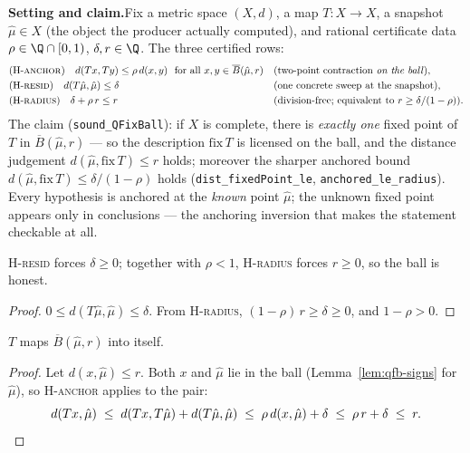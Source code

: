 

\textbf{Setting and claim.}\enspace Fix a metric space $(X, d)$, a map
$T : X \to X$, a snapshot $\hat\mu \in X$ (the object the producer
actually computed), and rational certificate data
$\rho \in \Q \cap [0, 1)$, $\delta, r \in \Q$. The three certified rows:
\begin{align*}
&\text{(H-\textsc{anchor})}\quad d(Tx, Ty) \leq \rho\, d(x, y)
  \ \text{ for all } x, y \in \overline{B}(\hat\mu, r)
  && \text{(two-point contraction \emph{on the ball})},\\
&\text{(H-\textsc{resid})}\quad d(T\hat\mu, \hat\mu) \leq \delta
  && \text{(one concrete sweep at the snapshot)},\\
&\text{(H-\textsc{radius})}\quad \delta + \rho\, r \leq r
  && \text{(division-free; equivalent to } r \geq \delta/(1-\rho)\text{)}.
\end{align*}
The claim (\texttt{sound\_QFixBall}): if $X$ is complete, there is
\emph{exactly one} fixed point of $T$ in $\overline{B}(\hat\mu, r)$ ---
so the description $\mathrm{fix}\,T$ is licensed on the ball, and the
distance judgement $d(\hat\mu, \mathrm{fix}\,T) \leq r$ holds; moreover
the sharper anchored bound $d(\hat\mu, \mathrm{fix}\,T) \leq
\delta/(1-\rho)$ holds (\texttt{dist\_fixedPoint\_le},
\texttt{anchored\_le\_radius}). Every hypothesis is anchored at the
\emph{known} point $\hat\mu$; the unknown fixed point appears only in
conclusions --- the anchoring inversion that makes the statement
checkable at all.

\begin{blemma}\label{lem:qfb-signs}
H-\textsc{resid} forces $\delta \geq 0$; together with $\rho < 1$,
H-\textsc{radius} forces $r \geq 0$, so the ball is honest.
\end{blemma}
\begin{proof}
$0 \leq d(T\hat\mu, \hat\mu) \leq \delta$. From H-\textsc{radius},
$(1 - \rho)\, r \geq \delta \geq 0$, and $1 - \rho > 0$.
\end{proof}

\begin{blemma}\label{lem:qfb-maps}
$T$ maps $\overline{B}(\hat\mu, r)$ into itself.
\end{blemma}
\begin{proof}
Let $d(x, \hat\mu) \leq r$. Both $x$ and $\hat\mu$ lie in the ball
(Lemma~\ref{lem:qfb-signs} for $\hat\mu$), so H-\textsc{anchor} applies
to the pair:
\[
d(Tx, \hat\mu) \;\leq\; d(Tx, T\hat\mu) + d(T\hat\mu, \hat\mu)
\;\leq\; \rho\, d(x, \hat\mu) + \delta
\;\leq\; \rho\, r + \delta \;\leq\; r . \qedhere
\]
\end{proof}

